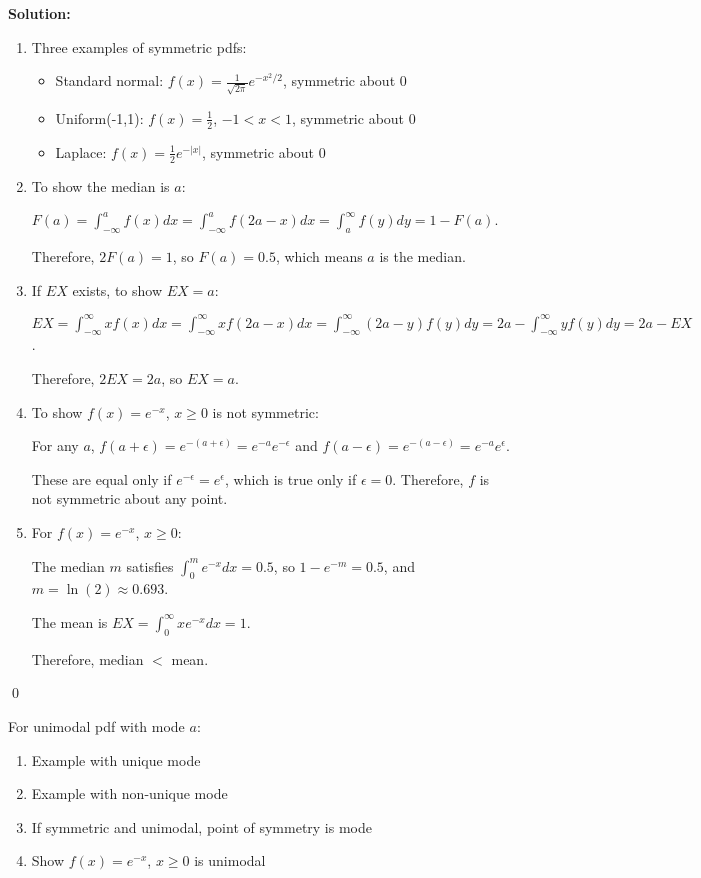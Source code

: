 \noindent\textbf{Solution:}
\begin{enumerate}[label=(\alph*)]
    \item Three examples of symmetric pdfs:
    \begin{itemize}
        \item Standard normal: $f(x) = \frac{1}{\sqrt{2\pi}}e^{-x^2/2}$, symmetric about 0
        \item Uniform(-1,1): $f(x) = \frac{1}{2}$, $-1 < x < 1$, symmetric about 0
        \item Laplace: $f(x) = \frac{1}{2}e^{-|x|}$, symmetric about 0
    \end{itemize}
    
    \item To show the median is $a$:
    
    $F(a) = \int_{-\infty}^a f(x)dx = \int_{-\infty}^a f(2a-x)dx = \int_a^{\infty} f(y)dy = 1 - F(a)$.
    
    Therefore, $2F(a) = 1$, so $F(a) = 0.5$, which means $a$ is the median.
    
    \item If $EX$ exists, to show $EX = a$:
    
    $EX = \int_{-\infty}^{\infty} x f(x)dx = \int_{-\infty}^{\infty} x f(2a-x)dx = \int_{-\infty}^{\infty} (2a-y) f(y)dy = 2a - \int_{-\infty}^{\infty} y f(y)dy = 2a - EX$.
    
    Therefore, $2EX = 2a$, so $EX = a$.
    
    \item To show $f(x)=e^{-x}$, $x\geq0$ is not symmetric:
    
    For any $a$, $f(a+\epsilon) = e^{-(a+\epsilon)} = e^{-a}e^{-\epsilon}$ and $f(a-\epsilon) = e^{-(a-\epsilon)} = e^{-a}e^{\epsilon}$.
    
    These are equal only if $e^{-\epsilon} = e^{\epsilon}$, which is true only if $\epsilon = 0$. Therefore, $f$ is not symmetric about any point.
    
    \item For $f(x)=e^{-x}$, $x\geq0$:
    
    The median $m$ satisfies $\int_0^m e^{-x}dx = 0.5$, so $1-e^{-m} = 0.5$, and $m = \ln(2) \approx 0.693$.
    
    The mean is $EX = \int_0^\infty xe^{-x}dx = 1$.
    
    Therefore, median $<$ mean.
\end{enumerate}


\qed
\begin{problembox}
For unimodal pdf with mode $a$:
\begin{enumerate}[label=(\alph*)]
    \item Example with unique mode
    \item Example with non-unique mode
    \item If symmetric and unimodal, point of symmetry is mode
    \item Show $f(x)=e^{-x}$, $x\geq0$ is unimodal
\end{enumerate}
\end{problembox}

